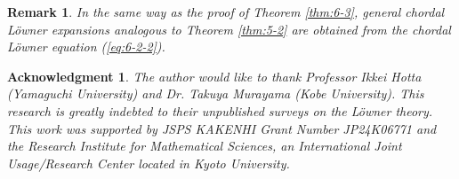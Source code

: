 \documentclass[12pt]{article}
\newtheorem{rem}[thm]{Remark}
\newtheorem{acknowledgment}{Acknowledgment}
\numberwithin{equation}{section}
\begin{document}
\begin{rem}\rm 
In the same way as the proof of Theorem \ref{thm:6-3}, 
general chordal L\"{o}wner expansions analogous to Theorem \ref{thm:5-2}  are obtained from 
the chordal L\"{o}wner equation (\ref{eq:6-2-2}). 
\end{rem}


\begin{acknowledgment}\rm
The author would like to thank 
Professor Ikkei Hotta (Yamaguchi University) and Dr. Takuya Murayama (Kobe University). 
This research is greatly indebted to their unpublished surveys on the L\"{o}wner theory. 
This work was supported by JSPS KAKENHI Grant Number JP24K06771 and the Research Institute for Mathematical Sciences,
an International Joint Usage/Research Center located in Kyoto University.
\end{acknowledgment}
\end{document}

